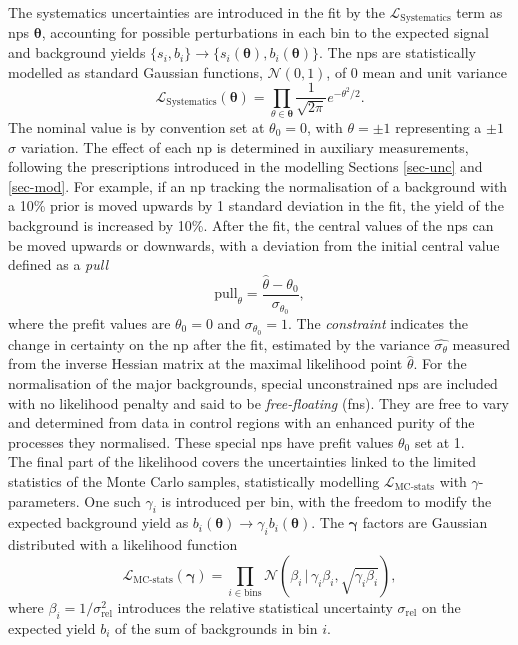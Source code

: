 The systematics uncertainties are introduced in the fit by the $\mathcal{L}_{\text{Systematics}}$ term as \glspl{np} $\boldsymbol{\theta}$, accounting for possible perturbations in each bin to the expected signal and background yields $\{s_i, b_i\} \rightarrow \{s_i(\boldsymbol{\theta}), b_i(\boldsymbol{\theta})\}$. The \glspl{np} are statistically modelled as standard Gaussian functions, $\mathcal{N}(0, 1)$, of 0 mean and unit variance \[ \mathcal{L}_{\text{Systematics}}(\boldsymbol{\theta}) = \prod_{\theta \in \boldsymbol{\theta}} \frac{1}{\sqrt{2\pi}} e^{- \theta^2/2}.\] The nominal value is by convention set at $\theta_0 = 0$, with $\theta = \pm 1$ representing a $\pm1$ $\sigma$ variation. The effect of each \gls{np} is determined in auxiliary measurements, following the prescriptions introduced in the modelling Sections \ref{sec-unc} and \ref{sec-mod}. For example, if an \gls{np} tracking the normalisation of a background with a 10\% prior is moved upwards by 1 standard deviation in the fit, the yield of the background is increased by 10\%. After the fit, the central values of the \glspl{np} can be moved upwards or downwards, with a deviation from the initial central value defined as a \textit{pull} \[ \text{pull}_{\theta} = \frac{\hat{\theta} - \theta_0}{\sigma_{\theta_0}}, \] where the prefit values are $\theta_0 = 0 $ and $\sigma_{\theta_0} = 1$. The \textit{constraint} indicates the change in certainty on the \gls{np} after the fit, estimated by the variance $\hat{\sigma_{\theta}}$ measured from the inverse Hessian matrix at the maximal likelihood point $\hat{\theta}$. For the normalisation of the major backgrounds, special unconstrained \glspl{np} are included with no likelihood penalty and said to be \textit{free-floating} (\glspl{fn}). They are free to vary and determined from data in control regions with an enhanced purity of the processes they normalised. These special \glspl{np} have prefit values $\theta_0$ set at 1. \\

The final part of the likelihood covers the uncertainties linked to the limited statistics of the Monte Carlo samples, statistically modelling $\mathcal{L}_{\text{MC-stats}}$ with $\gamma$-parameters. One such $\gamma_i$ is introduced per bin, with the freedom to modify the expected background yield as $b_i(\boldsymbol{\theta}) \rightarrow \gamma_i b_i(\boldsymbol{\theta})$. The $\boldsymbol{\gamma}$ factors are Gaussian distributed with a likelihood function \[\mathcal{L}_{\text{MC-stats}}(\boldsymbol{\gamma}) = \prod_{i\in \textrm{bins}} \mathcal{N} \left(\beta_i \,|\, \gamma_i\beta_i, \sqrt{\gamma_i\beta_i} \right),\] where $\beta_i = 1 / \sigma_{\text{rel}}^2$ introduces the relative statistical uncertainty $\sigma_{\text{rel}}$ on the expected yield $b_i$ of the sum of backgrounds in bin $i$. \\

